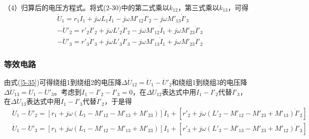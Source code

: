 \documentclass{book}
\begin{document}
（4）归算后的电压方程式。将式(2-30)中的第二式乘以${{k}_{12}}$，第三式乘以${{k}_{13}}$，可得
\begin{align}
& {{{\dot{U}}}_{1}}={{r}_{1}}{{{\dot{I}}}_{1}}+j\omega {{L}_{1}}{{{\dot{I}}}_{1}}-j\omega {{{{M}'}}_{12}}{{{{\dot{I}}'}}_{2}}-j\omega {{{{M}'}}_{13}}{{{{\dot{I}}'}}_{3}} \\ 
& -{{{{\dot{U}}'}}_{2}}={{{{r}'}}_{2}}{{{{\dot{I}}'}}_{2}}+j\omega {{{{L}'}}_{2}}{{{{\dot{I}}'}}_{2}}-j\omega {{{{M}'}}_{12}}{{{\dot{I}}}_{1}}+j\omega {{{{M}'}}_{23}}{{{{\dot{I}}'}}_{3}} \\ 
& -{{{{\dot{U}}'}}_{3}}={{{{r}'}}_{3}}{{{{\dot{I}}'}}_{3}}+j\omega {{{{L}'}}_{3}}{{{{\dot{I}}'}}_{3}}-j\omega {{{{M}'}}_{13}}{{{\dot{I}}}_{1}}+j\omega {{{{M}'}}_{23}}{{{{\dot{I}}'}}_{2}} 
\label{5-35}
\end{align}	

\subsubsection{等效电路}
由式(\ref{5-35})可得绕组1到绕组2的电压降$\Delta {{\dot{U}}_{12}}={{\dot{U}}_{1}}-{{{\dot{U}}'}_{2}}$和绕组1到绕组3的电压降$\Delta {{\dot{U}}_{13}}={{\dot{U}}_{1}}-{{{\dot{U}}'}_{3}}$。考虑到${{\dot{I}}_{1}}-{{{\dot{I}}'}_{2}}-{{{\dot{I}}'}_{3}}=0$，在$\Delta {{\dot{U}}_{12}}$表达式中用${{\dot{I}}_{1}}-{{{\dot{I}}'}_{2}}$代替${{{\dot{I}}'}_{3}}$，在$\Delta {{\dot{U}}_{13}}$表达式中用${{\dot{I}}_{1}}-{{{\dot{I}}'}_{3}}$代替${{{\dot{I}}'}_{2}}$，于是得
\begin{align}
& {{{\dot{U}}}_{1}}-{{{{\dot{U}}'}}_{2}}=\left[ {{r}_{1}}+j\omega \left( {{L}_{1}}-{{{{M}'}}_{12}}-{{{{M}'}}_{13}}+{{{{M}'}}_{23}} \right) \right]{{{\dot{I}}}_{1}}+\left[ {{{{r}'}}_{2}}+j\omega \left( {{{{L}'}}_{2}}-{{{{M}'}}_{12}}-{{{{M}'}}_{23}}+{{{{M}'}}_{13}} \right){{{{\dot{I}}'}}_{2}} \right] \\ 
& {{{\dot{U}}}_{1}}-{{{{\dot{U}}'}}_{3}}=\left[ {{r}_{1}}+j\omega \left( {{L}_{1}}-{{{{M}'}}_{12}}-{{{{M}'}}_{13}}+{{{{M}'}}_{23}} \right) \right]{{{\dot{I}}}_{1}}+\left[ {{{{r}'}}_{3}}+j\omega \left( {{{{L}'}}_{3}}-{{{{M}'}}_{13}}-{{{{M}'}}_{23}}+{{{{M}'}}_{12}} \right){{{{\dot{I}}'}}_{3}} \right] 
\label{5-36}
\end{align}	
\end{document}
